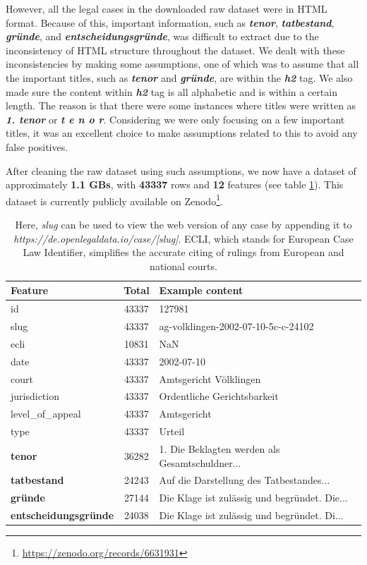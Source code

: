 \documentclass{IOS-Book-Article}
\begin{document}
However, all the legal cases in the downloaded raw dataset were in HTML format. Because of this, important information, such as \textbf{\textit{tenor}}, \textbf{\textit{tatbestand}}, \textbf{\textit{gründe}}, and \textbf{\textit{entscheidungsgründe}}, was difficult to extract due to the inconsistency of HTML structure throughout the dataset. We dealt with these inconsistencies by making some assumptions, one of which was to assume that all the important titles, such as \textbf{\textit{tenor}} and \textbf{\textit{gründe}}, are within the \textbf{\textit{h2}} tag. We also made sure the content within \textbf{\textit{h2}} tag is all alphabetic and is within a certain length. The reason is that there were some instances where titles were written as \textbf{\textit{1. tenor}} or \textbf{\textit{t e n o r}}. Considering we were only focusing on a few important titles, it was an excellent choice to make assumptions related to this to avoid any false positives.

After cleaning the raw dataset using such assumptions, we now have a dataset of approximately \textbf{1.1 GBs}, with \textbf{43337} rows and \textbf{12} features (see table \ref{tab:data_example}). This dataset is currently publicly available on Zenodo\footnote{\url{https://zenodo.org/records/6631931}}.

\begin{table}[!h]
	\centering
	\begin{tabular}{|l|c|l|}
	    \hline
		\textbf{Feature} & \textbf{Total} & \textbf{Example content}\\
		\hline
		id & 43337 & 127981\\
		slug & 43337 & ag-volklingen-2002-07-10-5c-c-24102\\
		ecli & 10831 & NaN\\
		date & 43337 & 2002-07-10\\
		court & 43337 & Amtsgericht Völklingen\\
		jurisdiction & 43337 & Ordentliche Gerichtsbarkeit\\
		level\_of\_appeal & 43337 & Amtsgericht\\
		type & 43337 & Urteil\\
		\textbf{tenor} & 36282 & 1. Die Beklagten werden als Gesamtschuldner...\\
		\textbf{tatbestand} & 24243 & Auf die Darstellung des Tatbestandes...\\
		\textbf{gründe} & 27144 & Die Klage ist zulässig und begründet. Die...\\
		\textbf{entscheidungsgründe} & 24038 &  Die Klage ist zulässig und begründet. Di...\\
		\hline
	\end{tabular}
	\caption{Here, \textit{slug} can be used to view the web version of any case by appending it to \textit{https://de.openlegaldata.io/case/[slug]}. ECLI, which stands for European Case Law Identifier, simplifies the accurate citing of rulings from European and national courts.}
	\label{tab:data_example}
\end{table}
\end{document}
